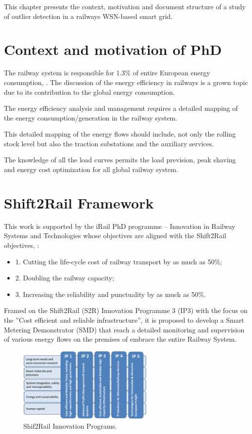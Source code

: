 This chapter presents the context, motivation and document structure of a study of outlier detection in a railways WSN-based smart grid. 

\section{Context and motivation of PhD}

The railway system is responsible for 1.3\% of entire European energy consumption, \cite{iea-uic2016}. 
The discussion of the energy efficiency in railways is a grown topic due to its contribution to the global energy consumption.

The energy efficiency analysis and management requires a detailed mapping of the energy consumption/generation in the railway system. 

This detailed mapping of the energy flows should include, not only the rolling stock level but also the traction substations and the auxiliary services.

The knowledge of all the load curves permits the load prevision, peak shaving and energy cost optimization for all global railway system.


\section{Shift2Rail Framework}

This work is supported by the iRail PhD programme – Innovation in Railway Systems and Technologies whose objectives are aligned with the Shift2Rail objectives, \cite{shift2rail2015}: 

\begin{itemize}
		\setlength\itemsep{-0.5em}
		\item 1. Cutting the life-cycle cost of railway transport by as much as 50\%;
		\item 2. Doubling the railway capacity;
		\item 3. Increasing the reliability and punctuality by as much as 50\%.
\end{itemize}


Framed on the Shift2Rail (S2R) Innovation Programme 3 (IP3) with the focus on the ”Cost efficient and reliable infrastructure”, it is proposed to develop a Smart Metering Demonstrator (SMD) that reach a detailed monitoring and supervision of various energy flows on the premises of embrace the entire Railway System.

\begin{figure}[h!]
	\centering
	\includegraphics[width=0.60\textwidth,keepaspectratio]{figures/IPs}
	\caption{Shif2Rail Innovation Programs. }
	\label{fig:ips}
\end{figure}

